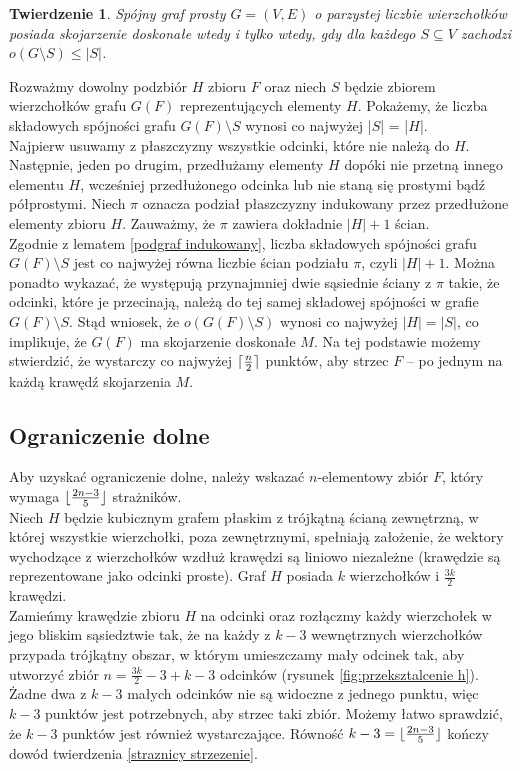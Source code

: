 \documentclass{xmgr}
\DeclarePairedDelimiter\ceil{\lceil}{\rceil}
\DeclarePairedDelimiter\floor{\lfloor}{\rfloor}
\newtheorem{Twierdzenie}{Twierdzenie}
\theoremstyle{definition}
\begin{document}
\begin{Twierdzenie} \cite{tutte}
	Spójny graf prosty $G=(V,E)$ o parzystej liczbie wierzchołków posiada skojarzenie doskonałe wtedy i tylko wtedy, gdy dla każdego $S \subseteq V$ zachodzi $o(G \setminus S) \le |S|$.
\end{Twierdzenie}

Rozważmy dowolny podzbiór $H$ zbioru $F$ oraz niech $S$ będzie zbiorem wierzchołków grafu $G(F)$ reprezentujących elementy $H$. Pokażemy, że liczba składowych spójności grafu $G(F) \setminus S$ wynosi co najwyżej |$S$| = |$H$|.
\\\indent Najpierw usuwamy z płaszczyzny wszystkie odcinki, które nie należą do $H$. Następnie, jeden po drugim, przedłużamy elementy $H$ dopóki nie przetną innego elementu $H$, wcześniej przedłużonego odcinka lub nie staną się prostymi bądź półprostymi. Niech $\pi$ oznacza podział płaszczyzny indukowany przez przedłużone elementy zbioru $H$. Zauważmy, że $\pi$ zawiera dokładnie $|H| + 1$ ścian. 
\\\indent Zgodnie z lematem \ref{podgraf indukowany}, liczba składowych spójności grafu $G(F) \setminus S$ jest co najwyżej równa liczbie ścian podziału $\pi$, czyli $|H| + 1$. Można ponadto wykazać, że występują przynajmniej dwie sąsiednie ściany z $\pi$ takie, że odcinki, które je przecinają, należą do tej samej składowej spójności w grafie $G(F) \setminus S$. Stąd wniosek, że $o (G(F) \setminus S)$ wynosi co najwyżej $|H| = |S|$, co implikuje, że $G(F)$ ma skojarzenie doskonałe $M$. Na tej podstawie możemy stwierdzić, że wystarczy co najwyżej $\ceil{\frac{n}{2}}$ punktów, aby strzec $F$ -- po jednym na każdą krawędź skojarzenia $M$.
\subsection{Ograniczenie dolne}
\indent Aby uzyskać ograniczenie dolne, należy wskazać $n$-elementowy zbiór $F$, który wymaga $\floor{\frac{2n-3}{5}}$ strażników.
\\\indent Niech $H$ będzie kubicznym grafem płaskim z trójkątną ścianą zewnętrzną, w której wszystkie wierzchołki, poza zewnętrznymi, spełniają założenie, że wektory wychodzące z wierzchołków wzdłuż krawędzi są liniowo niezależne \cite{topp} (krawędzie są reprezentowane jako odcinki proste). Graf $H$ posiada $k$ wierzchołków i $\frac{3k}{2}$ krawędzi.
\\\indent Zamieńmy krawędzie zbioru $H$ na odcinki oraz rozłączmy każdy wierzchołek w jego bliskim sąsiedztwie tak, że na każdy z $k-3$ wewnętrznych wierzchołków przypada trójkątny obszar, w którym umieszczamy mały odcinek tak, aby utworzyć zbiór $n = \frac{3k}{2}-3 + k -3$ odcinków (rysunek \ref{fig:przeksztalcenie h}). Żadne dwa z $k-3$ małych odcinków nie są widoczne z jednego punktu, więc $k-3$ punktów jest potrzebnych, aby strzec taki zbiór. Możemy łatwo sprawdzić, że $k-3$ punktów jest również wystarczające. Równość $k-3 = \floor{\frac{2n-3}{5}}$ kończy dowód twierdzenia \ref{straznicy strzezenie}.
\end{document}
